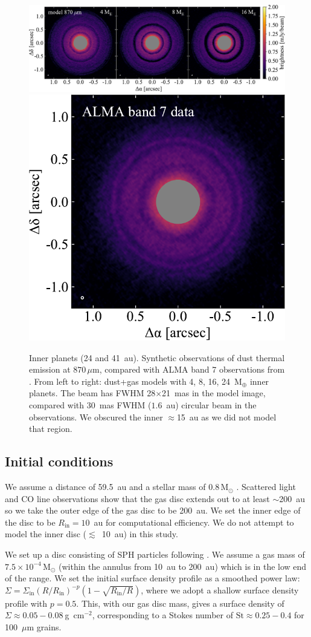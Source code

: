 \documentclass[usenatbib,a4paper,times]{mnras}
\newcommand{\st}{\mathrm{St}}
\renewcommand{\sun}{\mathrm{M}_{\odot}}
\renewcommand{\earth}{\mathrm{M}_{\oplus}}
\begin{document}
\begin{figure}
   \begin{center}
      \includegraphics[height=0.200\textwidth]{figs/alma-image.pdf} \quad
      \includegraphics[height=0.200\textwidth]{figs/andrews-2016.pdf}
      \caption{Inner planets (24 and 41~au). Synthetic observations of dust
         thermal emission at $870\,\mu$m, compared with ALMA band 7 observations
         from \citet{andrews:2016}. From left to right: dust+gas models with 4,
         8, 16, 24~$\earth$ inner planets. The beam has FWHM 28$\times$21~mas in
         the model image, compared with 30~mas FWHM ($1.6$~au) circular beam in
         the observations. We obscured the inner $\approx$15~au as we did not
         model that region.\label{fig:alma}}
   \end{center}
\end{figure}





\subsection{Initial conditions}

We assume a distance of 59.5~au \citep{gaia-collaboration:2016} and a stellar
mass of $0.8\,\sun{}$ \citep{andrews:2012}. Scattered light and CO line
observations show that the gas disc extends out to at least $\sim$200~au
\citep{thi:2010} so we take the outer edge of the gas disc to be 200~au. We set
the inner edge of the disc to be $R_{\mathrm{in}}=10$~au for computational
efficiency. We do not attempt to model the inner disc ($\lesssim$~10~au) in
this study.

We set up a disc consisting of SPH particles following \citet{lodato:2010}. We
assume a gas mass of $7.5\times 10^{-4}\,\sun{}$ (within the annulus from 10~au
to 200~au) which is in the low end of the \citet{thi:2010} range. We set the
initial surface density profile as a smoothed power law: $\Sigma =
\Sigma_{\mathrm{in}} {(R/R_{\mathrm{in}})}^{-p} (1-\sqrt{R_{\mathrm{in}}/R})$,
where we adopt a shallow surface density profile with $p=0.5$. This, with our
gas disc mass, gives a surface density of $\Sigma \approx 0.05-0.08\
$g~cm${}^{-2}$, corresponding to a Stokes number of $\st{}\approx 0.25-0.4$ for
100~$\mu$m grains.
\end{document}
